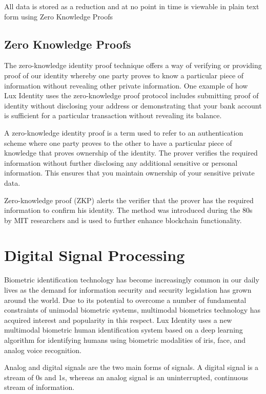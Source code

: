 \documentclass[11pt]{article}
\begin{document}
All data is stored as a reduction and at no point in time is viewable in plain text form using Zero Knowledge Proofs


\subsection{Zero Knowledge Proofs}

The zero-knowledge identity proof technique offers a way of verifying or providing proof of our identity whereby one party proves to know a particular piece of information without revealing other private information. One example of how Lux Identity uses the zero-knowledge proof protocol includes submitting proof of identity without disclosing your address or demonstrating that your bank account is sufficient for a particular transaction without revealing its balance.


A zero-knowledge identity proof is a term used to refer to an authentication scheme where one party proves to the other to have a particular piece of knowledge that proves ownership of the identity. The prover verifies the required information without further disclosing any additional sensitive or personal information. This ensures that you maintain ownership of your sensitive private data.


Zero-knowledge proof (ZKP) alerts the verifier that the prover has the required information to confirm his identity. The method was introduced during the 80s by MIT researchers and is used to further enhance blockchain functionality.


\section{Digital Signal Processing}

Biometric identification technology has become increasingly common in our daily lives as the demand for information security and security legislation has grown around the world. Due to its potential to overcome a number of fundamental constraints of unimodal biometric systems, multimodal biometrics technology has acquired interest and popularity in this respect. Lux Identity uses a new multimodal biometric human identification system based on a deep learning algorithm for identifying humans using biometric modalities of iris, face, and analog voice recognition.


Analog and digital signals are the two main forms of signals. A digital signal is a stream of 0s and 1s, whereas an analog signal is an uninterrupted, continuous stream of information.
\end{document}

